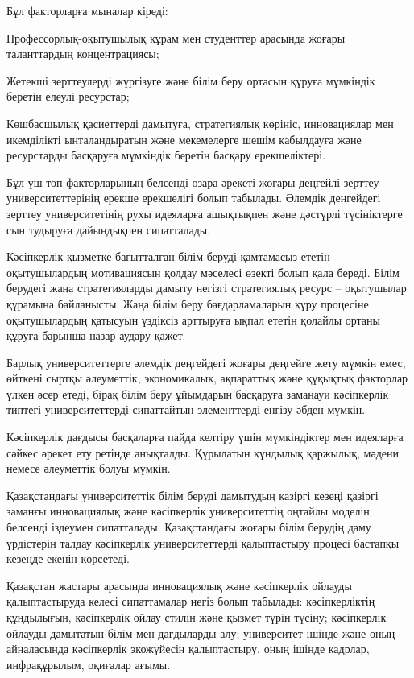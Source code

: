 \begin{multicols}{2}

Бұл факторларға мыналар кіреді:

Профессорлық-оқытушылық құрам мен студенттер арасында жоғары
таланттардың концентрациясы;

Жетекші зерттеулерді жүргізуге және білім беру ортасын құруға мүмкіндік
беретін елеулі ресурстар;

Көшбасшылық қасиеттерді дамытуға, стратегиялық көрініс, инновациялар мен
икемділікті ынталандыратын және мекемелерге шешім қабылдауға және
ресурстарды басқаруға мүмкіндік беретін басқару ерекшеліктері.

Бұл үш топ факторларының белсенді өзара әрекеті жоғары деңгейлі зерттеу
университеттерінің ерекше ерекшелігі болып табылады. Әлемдік деңгейдегі
зерттеу университетінің рухы идеяларға ашықтықпен және дәстүрлі
түсініктерге сын тудыруға дайындықпен сипатталады.

Кәсіпкерлік қызметке бағытталған білім беруді қамтамасыз ететін
оқытушылардың мотивациясын қолдау мәселесі өзекті болып қала береді.
Білім берудегі жаңа стратегияларды дамыту негізгі стратегиялық ресурс --
оқытушылар құрамына байланысты. Жаңа білім беру бағдарламаларын құру
процесіне оқытушылардың қатысуын үздіксіз арттыруға ықпал ететін қолайлы
ортаны құруға барынша назар аудару қажет.

Барлық университеттерге әлемдік деңгейдегі жоғары деңгейге жету мүмкін
емес, өйткені сыртқы әлеуметтік, экономикалық, ақпараттық және құқықтық
факторлар үлкен әсер етеді, бірақ білім беру ұйымдарын басқаруға
заманауи кәсіпкерлік типтегі университеттерді сипаттайтын элементтерді
енгізу әбден мүмкін.

Кәсіпкерлік дағдысы басқаларға пайда келтіру үшін мүмкіндіктер мен
идеяларға сәйкес әрекет ету ретінде анықталды. Құрылатын құндылық
қаржылық, мәдени немесе әлеуметтік болуы мүмкін.

Қазақстандағы университеттік білім беруді дамытудың қазіргі кезеңі
қазіргі заманғы инновациялық және кәсіпкерлік университеттің оңтайлы
моделін белсенді іздеумен сипатталады. Қазақстандағы жоғары білім
берудің даму үрдістерін талдау кәсіпкерлік университеттерді қалыптастыру
процесі бастапқы кезеңде екенін көрсетеді.

Қазақстан жастары арасында инновациялық және кәсіпкерлік ойлауды
қалыптастыруда келесі сипаттамалар негіз болып табылады: кәсіпкерліктің
құндылығын, кәсіпкерлік ойлау стилін және қызмет түрін түсіну;
кәсіпкерлік ойлауды дамытатын білім мен дағдыларды алу; университет
ішінде және оның айналасында кәсіпкерлік экожүйесін қалыптастыру, оның
ішінде кадрлар, инфрақұрылым, оқиғалар ағымы.


\end{multicols}
